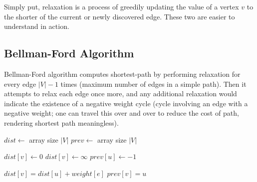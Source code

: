 \noindent Simply put, relaxation is a process of greedily updating the  value of a vertex $v$ to the shorter of the current  or newly discovered edge.
These two are easier to understand in action.

\subsection{Bellman-Ford Algorithm}

Bellman-Ford algorithm computes shortest-path by performing relaxation for every edge $|V| - 1$ times (maximum number of edges in a simple path).
Then it attempts to relax each edge once more, and any additional relaxation would indicate the existence of a negative weight cycle (cycle involving an edge with a negative weight; one can travel this over and over to reduce the cost of path, rendering shortest path meaningless).

\noindent \hrulefill
\begin{algorithmic}[1]
   
    \State $dist \gets$ array size $|V|$
    \State $prev \gets$ array size $|V|$

        $dist[v] \gets 0$
      \EndIf
        $dist[v] \gets \infty$
      \EndIf
      \State $prev[u] \gets -1$
    \EndFor
    \item[]
       
          \State $dist[v] = dist[u] + weight[e]$
          \State $prev[v] = u$
        \EndIf
      \EndFor
        \State {}
      \EndIf
    \EndFor
    \item[]
     
        \State {}
        \State {}
      \EndIf
    \EndFor
    \item[]
    \State {}
  \EndFunction
\end{algorithmic}
\noindent \hrulefill

